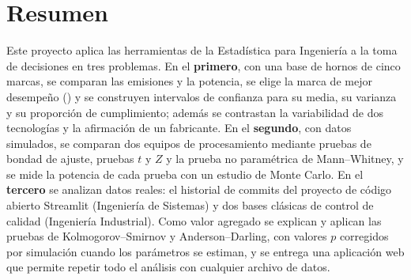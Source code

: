 \documentclass[11pt]{article}
\begin{document}
\begin{titlepage}
\begin{minipage}{0.84\textwidth}
\end{minipage}
\vfill
{}
\vspace*{0.6cm}
\end{titlepage}

\setcounter{page}{2}
\section*{Resumen}
Este proyecto aplica las herramientas de la Estadística para Ingeniería a la toma de decisiones en tres
problemas. En el \textbf{primero}, con una base de \nHornos{} hornos de cinco marcas, se comparan las emisiones y la
potencia, se elige la marca de mejor desempeño (\mejor) y se construyen intervalos de confianza para su media, su
varianza y su proporción de cumplimiento; además se contrastan la variabilidad de dos tecnologías y la afirmación
de un fabricante. En el \textbf{segundo}, con datos simulados, se comparan dos equipos de procesamiento mediante
pruebas de bondad de ajuste, pruebas $t$ y $Z$ y la prueba no paramétrica de Mann–Whitney, y se mide la potencia
de cada prueba con un estudio de Monte Carlo. En el \textbf{tercero} se analizan datos reales: el historial de
\nCommits{} commits del proyecto de código abierto Streamlit (Ingeniería de Sistemas) y dos bases clásicas de
control de calidad (Ingeniería Industrial). Como valor agregado se explican y aplican las pruebas de
Kolmogorov–Smirnov y Anderson–Darling, con valores $p$ corregidos por simulación cuando los parámetros se estiman,
y se entrega una aplicación web que permite repetir todo el análisis con cualquier archivo de datos.
\end{document}
